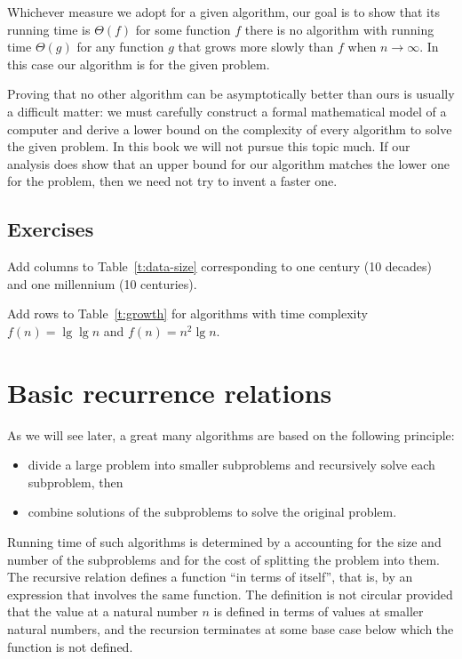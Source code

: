 Whichever measure we adopt for a given algorithm, our goal is  to show
that its running time is $\Theta(f)$ for some function $f$ 
there is no algorithm with running time $\Theta(g)$ for any function $g$
that grows more slowly than $f$ when $n \rightarrow \infty$. In this case
our algorithm is  for the given problem.

Proving that no other algorithm can be asymptotically better than
ours is usually a difficult matter: we must carefully construct a
formal mathematical model of a computer and derive a lower bound on the
complexity of every algorithm to solve the given problem. In this book
we will not pursue this topic much. If our analysis does show that an
upper bound for our algorithm matches the lower one for the problem,
then we need not try to invent a faster one.

 
\subsection*{Exercises}


\begin{Exercise}\label{exr:aa:data-size}
Add columns to Table~\ref{t:data-size} corresponding to
one century (10 decades) and one millennium (10 centuries).
\end{Exercise}

\begin{Exercise}\label{exr:aa:time-cmplx}
Add rows to Table~\ref{t:growth} for 
algorithms with time complexity \(f(n)=\lg\lg n\)
and \(f(n)=n^{2}\lg n\).
\end{Exercise}

\section{Basic recurrence relations}
\label{sec:recurrences}

As we will see later, a great many algorithms are
based on the following  principle:
\begin{itemize} 
\item divide a large problem into
smaller subproblems and recursively solve each subproblem, then 
\item combine solutions of the subproblems to
solve the original problem.
\end{itemize}
Running time of such algorithms is determined by
a  accounting for
the size and number of the subproblems and for the cost
of splitting the problem into them. The recursive 
relation defines a function ``in terms of itself'', that is, 
by an expression that involves the same function. The definition is not 
circular provided that the value at a natural number $n$ is defined in terms 
of values at smaller natural numbers, and the recursion terminates at some 
base case below which the function is not defined.

